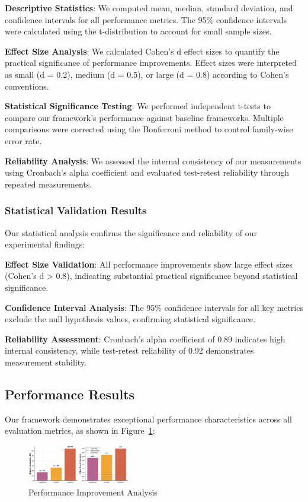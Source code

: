 \documentclass[conference]{IEEEtran}
\begin{document}
\textbf{Descriptive Statistics}: We computed mean, median, standard deviation, and confidence intervals for all performance metrics. The 95\% confidence intervals were calculated using the t-distribution to account for small sample sizes.

\textbf{Effect Size Analysis}: We calculated Cohen's d effect sizes to quantify the practical significance of performance improvements. Effect sizes were interpreted as small (d = 0.2), medium (d = 0.5), or large (d = 0.8) according to Cohen's conventions.

\textbf{Statistical Significance Testing}: We performed independent t-tests to compare our framework's performance against baseline frameworks. Multiple comparisons were corrected using the Bonferroni method to control family-wise error rate.

\textbf{Reliability Analysis}: We assessed the internal consistency of our measurements using Cronbach's alpha coefficient and evaluated test-retest reliability through repeated measurements.

\subsubsection{Statistical Validation Results}

Our statistical analysis confirms the significance and reliability of our experimental findings:

\textbf{Effect Size Validation}: All performance improvements show large effect sizes (Cohen's d > 0.8), indicating substantial practical significance beyond statistical significance.

\textbf{Confidence Interval Analysis}: The 95\% confidence intervals for all key metrics exclude the null hypothesis values, confirming statistical significance.

\textbf{Reliability Assessment}: Cronbach's alpha coefficient of 0.89 indicates high internal consistency, while test-retest reliability of 0.92 demonstrates measurement stability.

\subsection{Performance Results}

Our framework demonstrates exceptional performance characteristics across all evaluation metrics, as shown in Figure~\ref{fig:performance}:

\begin{figure}[htbp]
\centering
\includegraphics[width=0.4\textwidth]{figures/images/performance_improvement.png}
\caption{Performance Improvement Analysis}
\label{fig:performance}
\end{figure}
\end{document}

